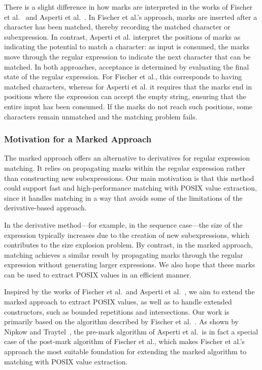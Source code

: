 \documentclass[12pt]{article}
\begin{document}
There is a slight difference in how marks are interpreted in the works of Fischer et al.~\cite{Fischer2010}  
and Asperti et al.~\cite{Asperti2010}.  
In Fischer et al.’s approach, marks are inserted after a character has been matched, thereby recording the matched character or subexpression.  
In contrast, Asperti et al. interpret the positions of marks as indicating the potential to match a character:  
as input is consumed, the marks move through the regular expression to indicate the next character that can be matched.  
In both approaches, acceptance is determined by evaluating the final state of the regular expression.  
For Fischer et al., this corresponds to having matched characters, whereas for Asperti et al. it requires that the marks end in positions  
where the expression can accept the empty string, ensuring that the entire input has been consumed.  
If the marks do not reach such positions, some characters remain unmatched and the matching problem fails.

\subsubsection{Motivation for a Marked Approach}

The marked approach offers an alternative to derivatives for regular expression matching.  
It relies on propagating marks within the regular expression rather than constructing new subexpressions.  
Our main motivation is that this method could support fast and high-performance matching with POSIX value extraction,  
since it handles matching in a way that avoids some of the limitations of the derivative-based approach.  

In the derivative method—for example, in the sequence case—the size of the expression typically increases  
due to the creation of new subexpressions, which contributes to the size explosion problem.  
By contrast, in the marked approach, matching achieves a similar result by propagating marks through the regular expression  
without generating larger expressions.  
We also hope that these marks can be used to extract POSIX values in an efficient manner.  

Inspired by the works of Fischer et al.\ and Asperti et al.~\cite{Fischer2010, Asperti2010},  
we aim to extend the marked approach to extract POSIX values, as well as to handle extended constructors, such as bounded 
repetitions and intersections. Our work is primarily based on the algorithm described by Fischer et al.~\cite{Fischer2010}.  
As shown by Nipkow and Traytel~\cite{NipkowTraytel2014}, the pre-mark algorithm of Asperti et al.\ is in fact a special case of the  
post-mark algorithm of Fischer et al., which makes Fischer et al.’s approach the most suitable foundation for extending the marked  
algorithm to matching with POSIX value extraction.
\end{document}
